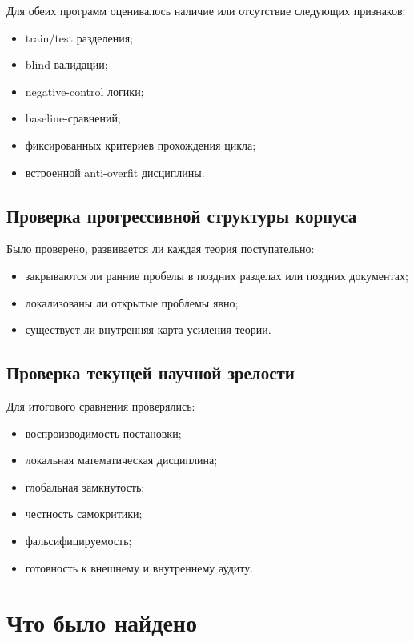 \documentclass[12pt,a4paper]{article}
\begin{document}
Для обеих программ оценивалось наличие или отсутствие следующих признаков:
\begin{itemize}
    \item train/test разделения;
    \item blind-валидации;
    \item negative-control логики;
    \item baseline-сравнений;
    \item фиксированных критериев прохождения цикла;
    \item встроенной anti-overfit дисциплины.
\end{itemize}

\subsection{Проверка прогрессивной структуры корпуса}

Было проверено, развивается ли каждая теория поступательно:
\begin{itemize}
    \item закрываются ли ранние пробелы в поздних разделах или поздних документах;
    \item локализованы ли открытые проблемы явно;
    \item существует ли внутренняя карта усиления теории.
\end{itemize}

\subsection{Проверка текущей научной зрелости}

Для итогового сравнения проверялись:
\begin{itemize}
    \item воспроизводимость постановки;
    \item локальная математическая дисциплина;
    \item глобальная замкнутость;
    \item честность самокритики;
    \item фальсифицируемость;
    \item готовность к внешнему и внутреннему аудиту.
\end{itemize}

\section{Что было найдено}
\end{document}
